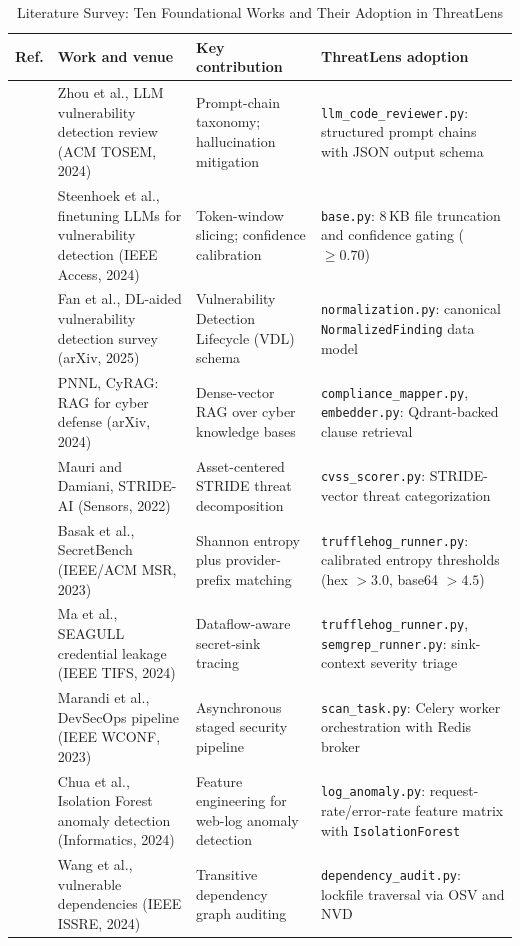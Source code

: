 \documentclass[conference]{IEEEtran}
\newcommand{\tsz}{\footnotesize}
\begin{document}
\begin{table}[!t]
\caption{Literature Survey: Ten Foundational Works and Their Adoption in ThreatLens}
\label{tab:litsurvey}
\centering\tsz
\renewcommand{\arraystretch}{1.15}
\begin{tabularx}{\textwidth}{@{}r L{0.30\textwidth} L{0.22\textwidth} X@{}}
\toprule
\textbf{Ref.} & \textbf{Work and venue} & \textbf{Key contribution} & \textbf{ThreatLens adoption}\\
\midrule
\cite{zhou2024llmvuln} & Zhou et al., LLM vulnerability detection review (ACM TOSEM, 2024) & Prompt-chain taxonomy; hallucination mitigation & \texttt{llm\_code\_reviewer.py}: structured prompt chains with JSON output schema\\
\cite{steenhoek2024finetune} & Steenhoek et al., finetuning LLMs for vulnerability detection (IEEE Access, 2024) & Token-window slicing; confidence calibration & \texttt{base.py}: 8\,KB file truncation and confidence gating ($\geq 0.70$)\\
\cite{fan2025dlvuln} & Fan et al., DL-aided vulnerability detection survey (arXiv, 2025) & Vulnerability Detection Lifecycle (VDL) schema & \texttt{normalization.py}: canonical \texttt{NormalizedFinding} data model\\
\cite{pnnl2024cyrag} & PNNL, CyRAG: RAG for cyber defense (arXiv, 2024) & Dense-vector RAG over cyber knowledge bases & \texttt{compliance\_mapper.py}, \texttt{embedder.py}: Qdrant-backed clause retrieval\\
\cite{mauri2022stride} & Mauri and Damiani, STRIDE-AI (Sensors, 2022) & Asset-centered STRIDE threat decomposition & \texttt{cvss\_scorer.py}: STRIDE-vector threat categorization\\
\cite{setu2023secretbench} & Basak et al., SecretBench (IEEE/ACM MSR, 2023) & Shannon entropy plus provider-prefix matching & \texttt{trufflehog\_runner.py}: calibrated entropy thresholds (hex $>3.0$, base64 $>4.5$)\\
\cite{ma2024seagull} & Ma et al., SEAGULL credential leakage (IEEE TIFS, 2024) & Dataflow-aware secret-sink tracing & \texttt{trufflehog\_runner.py}, \texttt{semgrep\_runner.py}: sink-context severity triage\\
\cite{marandi2023devsecops} & Marandi et al., DevSecOps pipeline (IEEE WCONF, 2023) & Asynchronous staged security pipeline & \texttt{scan\_task.py}: Celery worker orchestration with Redis broker\\
\cite{chua2024iforest} & Chua et al., Isolation Forest anomaly detection (Informatics, 2024) & Feature engineering for web-log anomaly detection & \texttt{log\_anomaly.py}: request-rate/error-rate feature matrix with \texttt{IsolationForest}\\
\cite{wang2024vulndeps} & Wang et al., vulnerable dependencies (IEEE ISSRE, 2024) & Transitive dependency graph auditing & \texttt{dependency\_audit.py}: lockfile traversal via OSV and NVD\\
\bottomrule
\end{tabularx}
\end{table}
\end{document}
